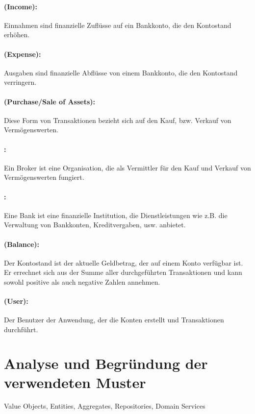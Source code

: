\paragraph*{ (Income):} Einnahmen sind finanzielle Zuflüsse auf ein Bankkonto, die den Kontostand erhöhen.

\paragraph*{ (Expense):} Ausgaben sind finanzielle Abflüsse von einem Bankkonto, die den Kontostand verringern.

\paragraph*{ (Purchase/Sale of Assets):} Diese Form von Transaktionen bezieht sich auf den Kauf, bzw. Verkauf von Vermögenswerten.

\paragraph*{:} Ein Broker ist eine Organisation, die als Vermittler für den Kauf und Verkauf von Vermögenswerten fungiert.

\paragraph*{:} Eine Bank ist eine finanzielle Institution, die Dienstleistungen wie z.B. die Verwaltung von Bankkonten, Kreditvergaben, usw. anbietet.

\paragraph*{ (Balance):} Der Kontostand ist der aktuelle Geldbetrag, der auf einem Konto verfügbar ist. Er errechnet sich aus der Summe aller durchgeführten Transaktionen und kann sowohl positive als auch negative Zahlen annehmen.

\paragraph*{ (User):} Der Benutzer der Anwendung, der die Konten erstellt und Transaktionen durchführt.









\section{Analyse und Begründung der verwendeten Muster}
Value Objects, Entities, Aggregates, Repositories, Domain Services